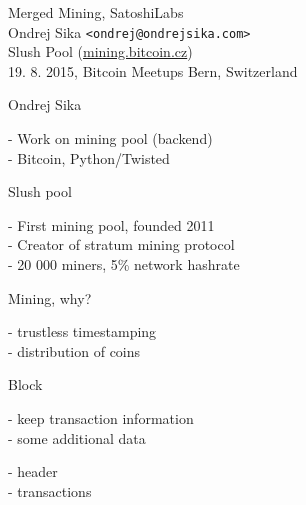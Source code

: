 \documentclass{beamer}
\begin{document}
\begin{frame}

    {\LARGE Merged Mining, SatoshiLabs}\\
    \vspace{7mm}
    {\Large Ondrej Sika \lstinline|<ondrej@ondrejsika.com>|}\\
    \vspace{7mm}
    {\large Slush Pool (\url{mining.bitcoin.cz})}\\
    \vspace{7mm}
    19. 8. 2015, Bitcoin Meetups Bern, Switzerland\\

\end{frame}

\begin{frame}

    {\LARGE Ondrej Sika}\\

    \vspace{5mm}

    - Work on mining pool (backend)\\
    - Bitcoin, Python/Twisted\\

    \vspace{10mm}

    {\LARGE Slush pool}\\

    \vspace{5mm}

    - First mining pool, founded 2011\\
    - Creator of stratum mining protocol\\
    - 20 000 miners, 5\% network hashrate\\

\end{frame}

\begin{frame}

    {\LARGE Mining, why?}\\

    \vspace{5mm}

    - trustless timestamping\\
    - distribution of coins\\

\end{frame}

\begin{frame}

    {\LARGE Block}\\

    \vspace{5mm}

    - keep transaction information\\
    - some additional data\\

    \vspace{5mm}

    - header\\
    - transactions\\

\end{frame}
\end{document}
